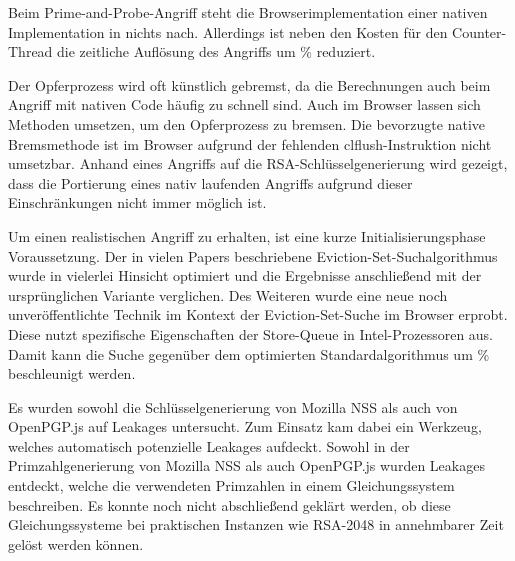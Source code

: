 Beim Prime-and-Probe-Angriff steht die Browserimplementation einer nativen Implementation in nichts nach. Allerdings ist neben den Kosten für den Counter-Thread die zeitliche Auflösung des Angriffs um  \% reduziert.

Der Opferprozess wird oft künstlich gebremst, da die Berechnungen auch beim Angriff mit nativen Code häufig zu schnell sind.
Auch im Browser lassen sich Methoden umsetzen, um den Opferprozess zu bremsen. 
Die bevorzugte native Bremsmethode ist im Browser aufgrund der fehlenden clflush-Instruktion nicht umsetzbar.
Anhand eines Angriffs auf die RSA-Schlüsselgenerierung wird gezeigt, dass die Portierung eines nativ laufenden Angriffs aufgrund dieser Einschränkungen nicht immer möglich ist.

\par\medskip

Um einen realistischen Angriff zu erhalten, ist eine kurze Initialisierungsphase Voraussetzung.
Der in vielen Papers beschriebene Eviction-Set-Suchalgorithmus \cite{PrimeAndAbort, LiuPrimeAndProbe, DriveByPaper} wurde in vielerlei Hinsicht optimiert und die Ergebnisse anschließend mit der ursprünglichen Variante verglichen. 
Des Weiteren wurde eine neue noch unveröffentlichte Technik im Kontext der Eviction-Set-Suche im Browser erprobt.
Diese nutzt spezifische Eigenschaften der Store-Queue in Intel-Prozessoren aus.
Damit kann die Suche gegenüber dem optimierten Standardalgorithmus um  \% beschleunigt werden.


\par\medskip

Es wurden sowohl die Schlüsselgenerierung von Mozilla NSS als auch von OpenPGP.js auf Leakages untersucht. 
Zum Einsatz kam dabei ein Werkzeug, welches automatisch potenzielle Leakages aufdeckt.
Sowohl in der Primzahlgenerierung von Mozilla NSS als auch OpenPGP.js wurden Leakages entdeckt, welche die verwendeten Primzahlen in einem Gleichungssystem beschreiben.
Es konnte noch nicht abschließend geklärt werden, ob diese Gleichungssysteme bei praktischen Instanzen wie RSA-2048 in annehmbarer Zeit gelöst werden können.

